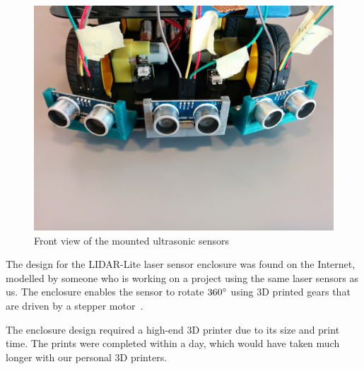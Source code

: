 \begin{figure}[H]
	\centering
	\includegraphics[width=.6\linewidth]{images/mounted_ultrasonic_sensors.jpg}
	\caption{Front view of the mounted ultrasonic sensors}
\end{figure}

The design for the LIDAR-Lite laser sensor enclosure was found on the Internet, modelled by someone who is working on a project using the same laser sensors as us. The enclosure enables the sensor to rotate $360\degree$ using 3D printed gears that are driven by a stepper motor~\cite{lidarenclosure}.

The enclosure design required a high-end 3D printer due to its size and print time. The prints were completed within a day, which would have taken much longer with our personal 3D printers.

